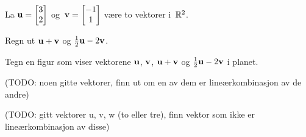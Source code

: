 \oppgaver

\begin{oppgave}
La $\mathbf{u} = \begin{bmatrix} 3 \\ 2 \end{bmatrix}$ og~$\mathbf{v} = \begin{bmatrix} -1 \\ 1 \end{bmatrix}$ være to vektorer
i~$\mathbb{R}^2$.

\begin{punkt}
Regn ut $\mathbf{u} + \mathbf{v}$ og $\frac{1}{2} \mathbf{u} - 2 \mathbf{v}$.
\end{punkt}

\begin{punkt}
Tegn en figur som viser vektorene $\mathbf{u}$, $\mathbf{v}$, $\mathbf{u} + \mathbf{v}$ og
$\frac{1}{2} \mathbf{u} - 2 \mathbf{v}$ i planet.
\end{punkt}
\end{oppgave}


\begin{oppgave}
(TODO: noen gitte vektorer, finn ut om en av dem er lineærkombinasjon av de andre)
\end{oppgave}


\begin{oppgave}
(TODO: gitt vektorer u, v, w (to eller tre), finn vektor som ikke er lineærkombinasjon av disse)
\end{oppgave}
